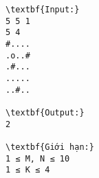 \begin{verbatim}
\textbf{Input:}
5 5 1
5 4
#....
.o..#
.#...
.....
..#..

\textbf{Output:}
2

\textbf{Giới hạn:}
1 ≤ M, N ≤ 10 
1 ≤ K ≤ 4 

\end{verbatim}